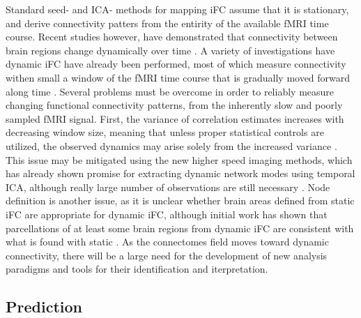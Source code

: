 Standard seed- and ICA- methods for mapping iFC assume that it is stationary, and derive connectivity patters from the entirity of the available fMRI time course. Recent studies however, have demonstrated that connectivity between brain regions change dynamically over time \cite{Chang, Keilholz, Hutchinson2013, Fu2013}. A variety of investigations have dynamic iFC have already been performed, most of which measure connectivity withen small a window of the fMRI time course that is gradually moved forward along time \cite{}. Several problems must be overcome in order to reliably measure changing functional connectivity patterns, from the inherently slow and poorly sampled fMRI signal. First, the variance of correlation estimates increases with decreasing window size, meaning that unless proper statistical controls are utilized, the observed dynamics may arise solely from the increased variance \cite{}. This issue may be mitigated using the new higher speed imaging methods, which has already shown promise for extracting dynamic network modes using temporal ICA, although really large number of observations are still necessary \cite{Smith2012}. Node definition is another issue, as it is unclear whether brain areas defined from static iFC are appropriate for dynamic iFC, although initial work has shown that parcellations of at least some brain regions from dynamic iFC are consistent with what is found with static \cite{Yang2013}. As the connectomes field moves toward dynamic connectivity, there will be a large need for the development of new analysis paradigms and tools for their identification and iterpretation. 

\subsection{Prediction}

